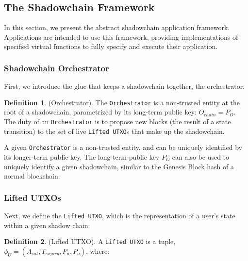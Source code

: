 \documentclass[10pt,a4paper]{article}
\theoremstyle{definition}
\newtheorem{definition}{Definition}[section]
\begin{document}

\subsection{The Shadowchain Framework}

In this section, we present the abstract shadowchain application framework.
Applications are intended to use this framework, providing implementations of
specified virtual functions to fully specify and execute their application.

\subsubsection{Shadowchain Orchestrator}

First, we introduce the glue that keeps a shadowchain together, the
orchestrator:

\theoremstyle{definition}
\begin{definition}{(Orchestrator).} The \texttt{Orchestrator} is a non-trusted
    entity at the root of a shadowchain, parametrized by its long-term public
    key: $O_{chain} = P_{O}$. The duty of an \texttt{Orchestrator} is to
    propose new blocks (the result of a state transition) to the set of live
    \texttt{Lifted UTXO}s that make up the shadowchain.
\end{definition}

A given \texttt{Orchestrator} is a non-trusted entity, and can be uniquely
identified by its longer-term public key. The long-term public key $P_{O}$ can
also be used to uniquely identify a given shadowchain, similar to the Genesis
Block hash of a normal blockchain.

\subsubsection{Lifted UTXOs}

Next, we define the \texttt{Lifted UTXO}, which is the representation of a
user's state within a given shadow chain:

\begin{definition}{(Lifted UTXO).} A \texttt{Lifted UTXO} is a tuple,
    $ \phi_{U} = (A_{sat}, T_{expiry}, P_{u}, P_{o})$, where:
\end{definition}
\end{document}

